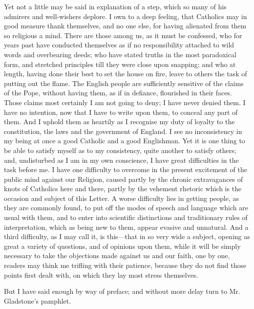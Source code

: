Yet not a little may be said in explanation of a step, which so
many of his admirers and well-wishers deplore. I own to a deep
feeling, that Catholics may in good measure thank themselves, and no
one else, for having alienated from them so religious a mind. There
are those among us, as it must be confessed, who for years past have
conducted themselves as if no responsibility attached to wild words
and overbearing deeds; who have stated truths in the most
paradoxical form, and stretched principles till they were close upon
snapping; and who at length, having done their best to set the house
on fire, leave to others the task of putting out the flame. The
English people are sufficiently sensitive of the claims of the Pope,
without having them, as if in defiance, flourished in their faces.
Those claims most certainly I am not going to deny; I have never
denied them. I have no intention, now that I have to write upon them,
to conceal any part of them. And I uphold them as heartily as I
recognise my duty of loyalty to the constitution, the laws and the
government of England. I see no inconsistency in my being at once a
good Catholic and a good Englishman. Yet it is one thing to be able to
satisfy myself as to my consistency, quite another to satisfy others;
and, undisturbed as I am in my own conscience, I have great
difficulties in the task before me. I have one difficulty to overcome
in the present excitement of the public mind against our Religion,
caused partly by the chronic extravagances of knots of Catholics here
and there, partly by the vehement rhetoric which is the occasion and
subject of this Letter. A worse difficulty lies in getting people, as
they are commonly found, to put off the modes of speech and language
which are usual with them, and to enter into scientific distinctions
and traditionary rules of interpretation, which as being new to them,
appear evasive and unnatural. And a third difficulty, as I may call
it, is this—that in so very wide a subject, opening as great a
variety of questions, and of opinions upon them, while it will be
simply necessary to take the objections made against us and our faith,
one by one, readers may think me trifling with their patience,
because they do not find those points first dealt with, on which they
lay most stress themselves.


But I have said enough by way of preface; and without more delay
turn to Mr. Gladstone's pamphlet.


